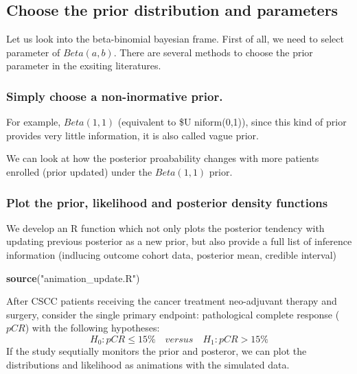 \documentclass[]{article}
\newenvironment{Shaded}{\begin{snugshade}}{\end{snugshade}}
\newcommand{\KeywordTok}[1]{\textcolor[rgb]{0.13,0.29,0.53}{\textbf{{#1}}}}
\newcommand{\StringTok}[1]{\textcolor[rgb]{0.31,0.60,0.02}{{#1}}}
\newcommand{\NormalTok}[1]{{#1}}
\begin{document}
\subsection{Choose the prior distribution and
parameters}\label{choose-the-prior-distribution-and-parameters}

Let us look into the beta-binomial bayesian frame. First of all, we need
to select parameter of \(Beta(a,b)\). There are several methods to
choose the prior parameter in the exsiting literatures.

\subsubsection{Simply choose a non-inormative
prior.}\label{simply-choose-a-non-inormative-prior.}

For example, \(Beta(1,1)\) (equivalent to \$U niform(0,1)), since this
kind of prior provides very little information, it is also called vague
prior.

We can look at how the posterior proabability changes with more patients
enrolled (prior updated) under the \(Beta(1,1)\) prior.

\subsubsection{Plot the prior, likelihood and posterior density
functions}\label{plot-the-prior-likelihood-and-posterior-density-functions}

We develop an R function which not only plots the posterior tendency
with updating previous posterior as a new prior, but also provide a full
list of inference information (indlucing outcome cohort data, posterior
mean, credible interval)

\begin{Shaded}
\begin{Highlighting}[]
\KeywordTok{source}\NormalTok{(}\StringTok{"animation_update.R"}\NormalTok{)}
\end{Highlighting}
\end{Shaded}

After CSCC patients receiving the cancer treatment neo-adjuvant therapy
and surgery, consider the single primary endpoint: pathological complete
response (\(pCR\)) with the following hypotheses:
\[H_0: pCR \le 15\% \quad versus \quad H_1: pCR > 15\%\] If the study
sequtially monitors the prior and posteror, we can plot the
distributions and likelihood as animations with the simulated data.
\end{document}
